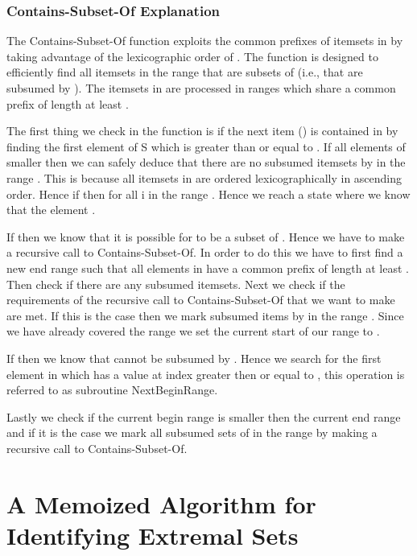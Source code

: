 \documentclass[13pt,a4paper]{article}
\begin{document}
\subsubsection{Contains-Subset-Of Explanation}
The Contains-Subset-Of function exploits the common prefixes of itemsets in  by taking advantage of the lexicographic order of . 
The function is designed to efficiently find all itemsets in the range  that are subsets of  (i.e., that are subsumed by ).
The itemsets in  are processed in ranges which share a common prefix of length at least .

The first thing we check in the function is if the next item () is contained in  by finding the first element of S which is greater than or equal to . 
If all elements of  smaller then  we can safely deduce that there are no subsumed itemsets by  in the range . 
This is because all itemsets in  are ordered lexicographically in ascending order. Hence if  then 
 for all i in the range . Hence we reach a state where we know that the element .

If  then we know that it is possible for  to be a subset of . 
Hence we have to make a recursive call to Contains-Subset-Of. In order to do this we have to first find a new end range  such that all elements in  have a common prefix of length at least . Then  
check if there are any subsumed itemsets. Next we check if the requirements of the recursive call to Contains-Subset-Of that we want to make are met. If this is the case then we mark 
subsumed items by  in the range . Since we have already covered the range  we set the current start of our range  to .

If  then we know that  cannot be subsumed by . Hence we search for the first element in  which has a value at index  greater then or equal to , this operation is referred to as 
subroutine NextBeginRange.

Lastly we check if the current begin range is smaller then the current end range and if it is the case we mark all subsumed sets of  in the range  by making a recursive call to Contains-Subset-Of.






\section{A Memoized Algorithm for Identifying Extremal Sets}
\label{sec:memoized}
\end{document}
